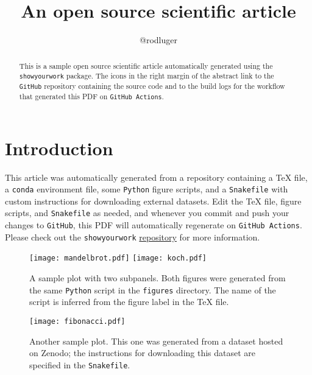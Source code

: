 \documentclass[twocolumn]{aastex631}
\begin{document}
\title{An open source scientific article}

\author{@rodluger}

\begin{abstract}
    This is a sample open source scientific article automatically generated using the \texttt{showyourwork} package. 
    The icons in the right margin of the abstract link to the \texttt{GitHub} repository containing the source code and to the build logs for the workflow that generated this PDF on \texttt{GitHub Actions}.
\end{abstract}

\section{Introduction}
This article was automatically generated from a repository containing a TeX file,
a \texttt{conda} environment file, some \texttt{Python} figure scripts, and a \texttt{Snakefile} with custom instructions for downloading external datasets.
Edit the TeX file, figure scripts, and \texttt{Snakefile} as needed, and whenever you commit and push your changes to \texttt{GitHub}, this PDF will automatically regenerate on \texttt{GitHub Actions}. Please check out the \texttt{showyourwork} \href{https://github.com/rodluger/showyourwork}{repository} for more information.

\begin{figure}[ht!]
    \begin{centering}
        \texttt{[image: mandelbrot.pdf]}
        \texttt{[image: koch.pdf]}
        \caption{
            A sample plot with two subpanels. 
            Both figures were generated from the same \texttt{Python} script in the \texttt{figures} directory. 
            The name of the script is inferred from the figure label in the TeX file.
        }
        \label{fig:fractals}
    \end{centering}
\end{figure}

\begin{figure}[ht!]
    \begin{centering}
        \texttt{[image: fibonacci.pdf]}
        \caption{
            Another sample plot. 
            This one was generated from a dataset hosted on Zenodo; the instructions for downloading this dataset are specified in the \texttt{Snakefile}.
        }
        \label{fig:fibonacci}
    \end{centering}
\end{figure}
\end{document}

